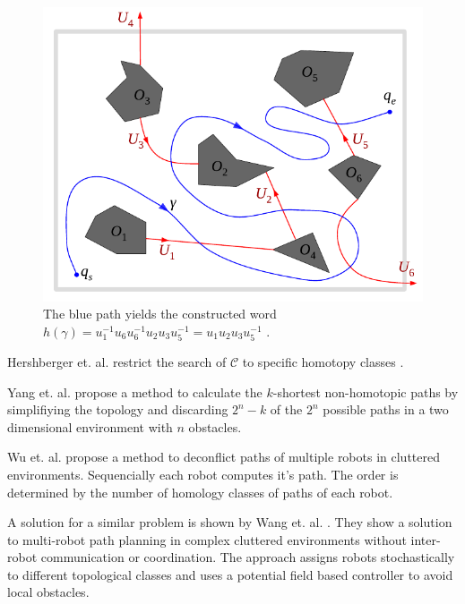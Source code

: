 \documentclass[]{article}
\begin{document}
\begin{figure}[h] \centering
  \includegraphics[scale=.4]{word_construction}
  \caption{The blue path yields the constructed word
    \(h(\gamma) = u_{1}^{-1} u_{6} u_{6}^{-1} u_{2} u_{3} u_{5}^{-1} =
    u_{1} u_{2} u_{3} u_{5}^{-1}\)
    \cite{bhattacharyaPathHomotopyInvariants2018}.}
  \label{fig:word-construction}
\end{figure}

Hershberger et. al. restrict
the search of \(\mathcal{C}\) to specific homotopy classes
\cite{hershbergerComputingMinimumLength1994}.

Yang et. al. \cite{yangEfficientSearchShortest2022} propose a method
to calculate the \(k\)-shortest non-homotopic paths by simplifiying
the topology and discarding \(2^{n} - k\) of the \(2^{n}\) possible
paths in a two dimensional environment with \(n\) obstacles.

Wu et. al. \cite{wuMultiRobotPathDeconfliction2020} propose a method
to deconflict paths of multiple robots in cluttered environments.
Sequencially each robot computes it's path. The order is determined by
the number of homology classes of paths of each robot.

A solution for a similar problem is shown by Wang
et. al. \cite{wangCoordinationfreeMultirobotPath2022}. They show a
solution to multi-robot path planning in complex cluttered
environments without inter-robot communication or coordination. The
approach assigns robots stochastically to different topological
classes and uses a potential field based controller to avoid local
obstacles.
\end{document}
